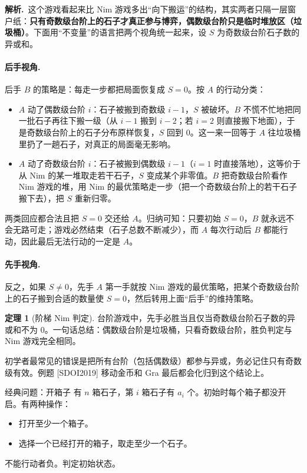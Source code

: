 \documentclass[UTF8,a4paper,11pt,oneside,openany,fontset=fandol]{ctexbook}
\theoremstyle{definition}
\newtheorem{theorem}[definition]{定理}
\newcommand{\sol}{\par\noindent\textbf{解析.}\ }
\begin{document}
\sol 这个游戏看起来比 Nim 游戏多出“向下搬运”的结构，其实两者只隔一层窗户纸：\textbf{只有奇数级台阶上的石子才真正参与博弈，偶数级台阶只是临时堆放区（垃圾桶）}。下面用“不变量”的语言把两个视角统一起来，设 $S$ 为奇数级台阶石子数的异或和。

\paragraph{后手视角.} 后手 $B$ 的策略是：每走一步都把局面恢复成 $S=0$。按 $A$ 的行动分类：
\begin{itemize}
\item $A$ 动了偶数级台阶 $i$：石子被搬到奇数级 $i-1$，$S$ 被破坏。$B$ 不慌不忙地把同一批石子再往下搬一级（从 $i-1$ 搬到 $i-2$；若 $i=2$ 则直接搬下地面），于是奇数级台阶上的石子分布原样恢复，$S$ 回到 $0$。这一来一回等于 $A$ 往垃圾桶里扔了一趟石子，对真正的局面毫无影响。
\item $A$ 动了奇数级台阶 $i$：石子被搬到偶数级 $i-1$（$i=1$ 时直接落地），这等价于从 Nim 的某一堆取走若干石子，$S$ 变成某个非零值。$B$ 把奇数级台阶看作 Nim 游戏的堆，用 Nim 的最优策略走一步（把一个奇数级台阶上的若干石子搬下去），把 $S$ 重新归零。
\end{itemize}
两类回应都合法且把 $S=0$ 交还给 $A$。归纳可知：只要初始 $S=0$，$B$ 就永远不会无路可走；游戏必然结束（石子总数不断减少），而 $A$ 每次行动后 $B$ 都能行动，因此最后无法行动的一定是 $A$。

\paragraph{先手视角.} 反之，如果 $S\ne0$，先手 $A$ 第一手就按 Nim 游戏的最优策略，把某个奇数级台阶上的石子搬到合适的数量使 $S=0$，然后转用上面“后手”的维持策略。

\begin{theorem}[阶梯 Nim 判定]\label{thm:stairnim}
台阶游戏中，先手必胜当且仅当奇数级台阶石子数的异或和不为 $0$。一句话总结：偶数级台阶是垃圾桶，只看奇数级台阶，胜负判定与 Nim 游戏完全相同。
\end{theorem}

\begin{pitfall}[只有奇数级参与异或]
初学者最常见的错误是把所有台阶（包括偶数级）都参与异或，务必记住只有奇数级有效。例题 [SDOI2019] 移动金币和 Gra 最后都会化归到这个结论上。
\end{pitfall}

\begin{problem}{经典问题：开箱子}
有 $n$ 箱石子，第 $i$ 箱石子有 $a_i$ 个。初始时每个箱子都没开启。有两种操作：
\begin{itemize}
\item 打开至少一个箱子。
\item 选择一个已经打开的箱子，取走至少一个石子。
\end{itemize}
不能行动者负。判定初始状态。
\end{problem}
\end{document}
